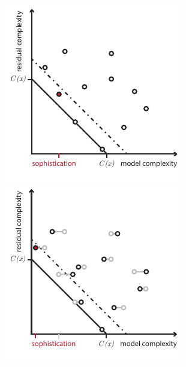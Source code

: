 \begin{figure}[tb]
  \vspace{-2\baselineskip}
  \centering
  \begin{minipage}{0.40\textwidth}
     \includegraphics[width=\textwidth]{./images/sophistication.pdf}
  \end{minipage}
  \begin{minipage}{0.40\textwidth}
     \includegraphics[width=\textwidth]{./images/sophistication-jump.pdf}

\end{minipage}
\end{figure}
